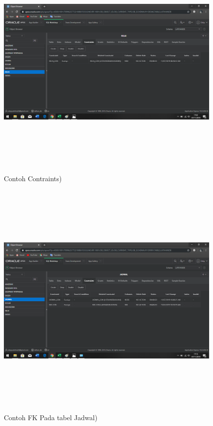 \documentclass[a4, 13pt]{article}
\begin{document}
     \begin{figure}[!htbp]
        \centering
        \includegraphics[width=16cm, height=12cm]{pictures/G.png}
        \caption{Contoh Contraints)}
        \label{fig:my_label}
    \end{figure}
    \vspace{2cm}
     \begin{figure}[!htbp]
        \centering
        \includegraphics[width=16cm, height=12cm]{pictures/H.png}
        \caption{Contoh FK Pada tabel Jadwal)}
        \label{fig:my_label}
    \end{figure}
    \vspace{2cm}
    
\end{document}
